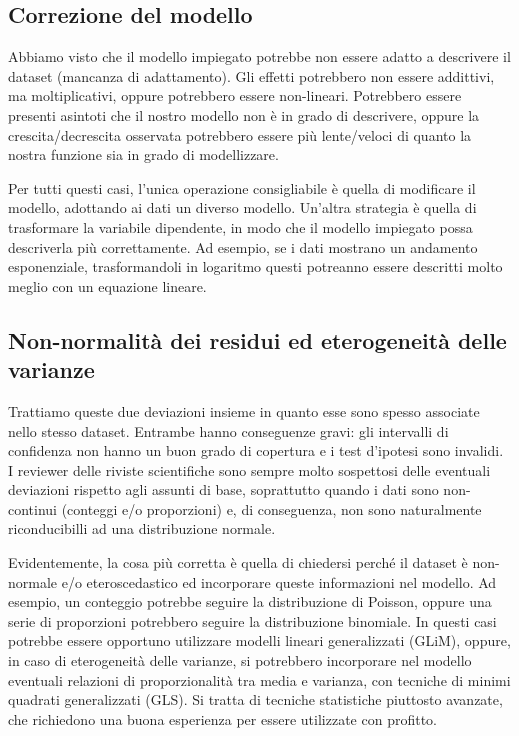 \documentclass[a4paper,12pt,oneside]{book}
\theoremstyle{definition}
\theoremstyle{definition}
\theoremstyle{definition}
\theoremstyle{remark}
\begin{document}
\subsection{Correzione del modello}\label{correzione-del-modello}

Abbiamo visto che il modello impiegato potrebbe non essere adatto a
descrivere il dataset (mancanza di adattamento). Gli effetti potrebbero
non essere addittivi, ma moltiplicativi, oppure potrebbero essere
non-lineari. Potrebbero essere presenti asintoti che il nostro modello
non è in grado di descrivere, oppure la crescita/decrescita osservata
potrebbero essere più lente/veloci di quanto la nostra funzione sia in
grado di modellizzare.

Per tutti questi casi, l'unica operazione consigliabile è quella di
modificare il modello, adottando ai dati un diverso modello. Un'altra
strategia è quella di trasformare la variabile dipendente, in modo che
il modello impiegato possa descriverla più correttamente. Ad esempio, se
i dati mostrano un andamento esponenziale, trasformandoli in logaritmo
questi potreanno essere descritti molto meglio con un equazione lineare.

\subsection{Non-normalità dei residui ed eterogeneità delle
varianze}\label{non-normalita-dei-residui-ed-eterogeneita-delle-varianze}

Trattiamo queste due deviazioni insieme in quanto esse sono spesso
associate nello stesso dataset. Entrambe hanno conseguenze gravi: gli
intervalli di confidenza non hanno un buon grado di copertura e i test
d'ipotesi sono invalidi. I reviewer delle riviste scientifiche sono
sempre molto sospettosi delle eventuali deviazioni rispetto agli assunti
di base, soprattutto quando i dati sono non-continui (conteggi e/o
proporzioni) e, di conseguenza, non sono naturalmente riconducibilli ad
una distribuzione normale.

Evidentemente, la cosa più corretta è quella di chiedersi perché il
dataset è non-normale e/o eteroscedastico ed incorporare queste
informazioni nel modello. Ad esempio, un conteggio potrebbe seguire la
distribuzione di Poisson, oppure una serie di proporzioni potrebbero
seguire la distribuzione binomiale. In questi casi potrebbe essere
opportuno utilizzare modelli lineari generalizzati (GLiM), oppure, in
caso di eterogeneità delle varianze, si potrebbero incorporare nel
modello eventuali relazioni di proporzionalità tra media e varianza, con
tecniche di minimi quadrati generalizzati (GLS). Si tratta di tecniche
statistiche piuttosto avanzate, che richiedono una buona esperienza per
essere utilizzate con profitto.
\end{document}
